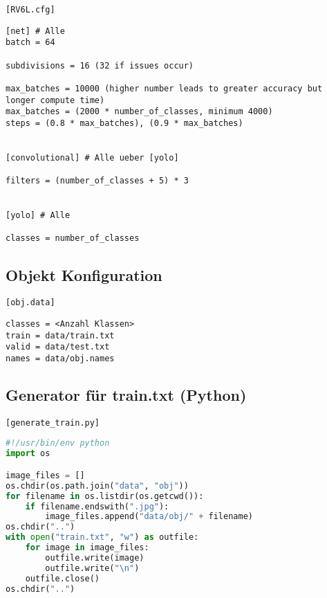 \lstinline{[RV6L.cfg]}

\begin{lstlisting}
[net] # Alle
batch = 64

subdivisions = 16 (32 if issues occur)

max_batches = 10000 (higher number leads to greater accuracy but longer compute time)
max_batches = (2000 * number_of_classes, minimum 4000)
steps = (0.8 * max_batches), (0.9 * max_batches)


[convolutional] # Alle ueber [yolo]

filters = (number_of_classes + 5) * 3


[yolo] # Alle

classes = number_of_classes
\end{lstlisting}

\subsection{Objekt Konfiguration} \label{subsec:object_config}

\lstinline{[obj.data]}

\begin{lstlisting}
classes = <Anzahl Klassen>
train = data/train.txt
valid = data/test.txt
names = data/obj.names  
\end{lstlisting}

\subsection{Generator für train.txt (Python)} \label{subsec:darknet_train}

\lstinline{[generate_train.py]}

\begin{lstlisting}[language=python]
#!/usr/bin/env python
import os

image_files = []
os.chdir(os.path.join("data", "obj"))
for filename in os.listdir(os.getcwd()):
    if filename.endswith(".jpg"):
        image_files.append("data/obj/" + filename)
os.chdir("..")
with open("train.txt", "w") as outfile:
    for image in image_files:
        outfile.write(image)
        outfile.write("\n")
    outfile.close()
os.chdir("..")
\end{lstlisting}
\cite{the_ai_guy_yologeneratetrainingfile_2021}